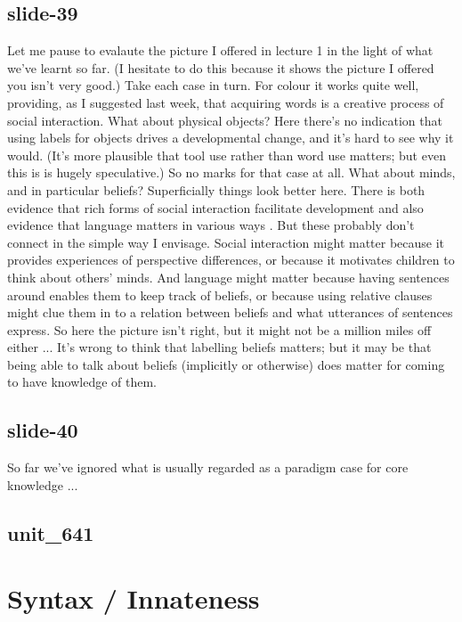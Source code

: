 \documentclass[12pt,\papersize]{extarticle}
\begin{document}
\subsection{slide-39}
Let me pause to evalaute the picture I offered in lecture 1 in the light of what we've learnt so far.
(I hesitate to do this because it shows the picture I offered you isn't very good.)
Take each case in turn.
For colour it works quite well, providing, as I suggested last week, that acquiring words is a creative process of social interaction.
What about physical objects? Here there's no indication that using labels for objects drives a developmental change, and it's hard to see why it would.
(It's more plausible that tool use rather than word use matters; but even this is is hugely speculative.)
So no marks for that case at all.
What about minds, and in particular beliefs?
Superficially things look better here. There is both evidence that rich forms of social interaction facilitate development \citep{Hughes:2006fu}
and also evidence that language matters in various ways \citep{Astington2005ot}.
But these probably don't connect in the simple way I envisage.
Social interaction might matter because it provides experiences of perspective differences, or because it motivates children to think about others' minds.
And language might matter because having sentences around enables them to keep track of beliefs, or because using relative clauses might clue them in to a relation between beliefs and what utterances of sentences express.
So here the picture isn't right, but it might not be a million miles off either ...
It's wrong to think that labelling beliefs matters; but it may be that being able to talk about beliefs (implicitly or otherwise) does matter for coming to have knowledge of them.
 
 
\subsection{slide-40}
So far we've ignored what is usually regarded as a paradigm case for core knowledge ...
 
 
\subsection{unit\_641}
 
\section{Syntax / Innateness}
 
\end{document}
